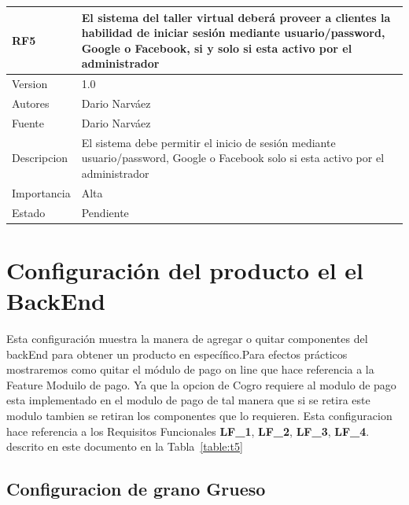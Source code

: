 \documentclass[10pt,a4paper,openany]{book}
\begin{document}
\begin{longtable}{|p{3cm}|p{3cm}|p{3cm}|p{3cm}|p{3cm}|} \hline	

RF5 & \multicolumn{4}{p{12cm}|}{El sistema del taller virtual deberá proveer a clientes la habilidad de iniciar sesión mediante usuario/password, Google o Facebook, si y solo si esta activo por el administrador} \\ \hline	
Version     & \multicolumn{4}{p{12cm}|}{1.0} \\ \hline	
Autores & \multicolumn{4}{p{12cm}|}{Dario Narváez} \\ \hline	
Fuente                & \multicolumn{4}{p{12cm}|}{Dario Narváez} \\ \hline	
Descripcion         & \multicolumn{4}{p{12cm}|}{El sistema debe permitir el inicio de sesión mediante usuario/password, Google o Facebook solo si esta activo por el administrador} \\ \hline	
Importancia                 & \multicolumn{4}{p{12cm}|}{Alta} \\ \hline	
Estado        & \multicolumn{4}{p{12cm}|}{Pendiente} \\ \hline	
\end{longtable}	


\section{Configuración del producto el el BackEnd}

Esta configuración muestra la manera de agregar o quitar componentes del backEnd para obtener un producto en específico.Para efectos prácticos mostraremos como quitar el módulo de pago on line que hace referencia a la Feature Moduilo de pago. Ya que la opcion de Cogro requiere al modulo de pago esta implementado en el modulo de pago de tal manera que si se retira este modulo tambien se retiran los componentes que lo requieren. Esta configuracion hace referencia a los Requisitos Funcionales \textbf{LF\_1}, \textbf{LF\_2}, \textbf{LF\_3}, \textbf{LF\_4}. descrito en este documento en la Tabla~\ref{table:t5}

\subsection{Configuracion de grano Grueso}
\end{document}
